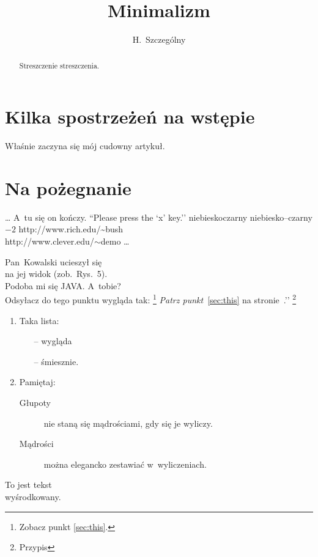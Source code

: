 \documentclass[a4paper]{article}
\author{H.~Szczególny}
\title{Minimalizm}
\begin{document}
\maketitle
\tableofcontents
\section{Kilka spostrzeżeń na wstępie} %
Właśnie zaczyna się mój cudowny artykuł.
\section{Na pożegnanie}
\ldots{} A~tu się on kończy.
``Please press the ‘x’ key.’’
niebiesko{\dywiz}czarny %
niebiesko--czarny %
$-2$%
http://www.rich.edu/\~{}bush \\%
http://www.clever.edu/$\sim$demo
\texteuro \ldots\\ 
\begin{abstract}
Streszczenie streszczenia.\\
\end{abstract}
Pan~Kowalski ucieszył się\\
na jej widok (zob.~Rys.~5).\\
Podoba mi się JAVA\@. A~tobie?\\
Odsyłacz do tego punktu
\label{sec:this} wygląda tak:
\footnote{Zobacz punkt \ref{sec:this}.}
\emph{Patrz punkt}~\ref{sec:this} na
stronie~\pageref{sec:this}.’’
\footnote{Przypis}
\begin{enumerate}
 \item Taka lista:
 \begin{itemize}
 \item[--] wygląda
 \item[--] śmiesznie.
 \end{itemize}
 \item Pamiętaj:
 \begin{description}
 \item[Głupoty] nie staną się
 mądrościami, gdy się je wyliczy.
 \item[Mądrości] można elegancko
 zestawiać w~wyliczeniach.
 \end{description}
\end{enumerate}
\begin{center}
To jest tekst\\wyśrodkowany.
\end{center}
\end{document}
